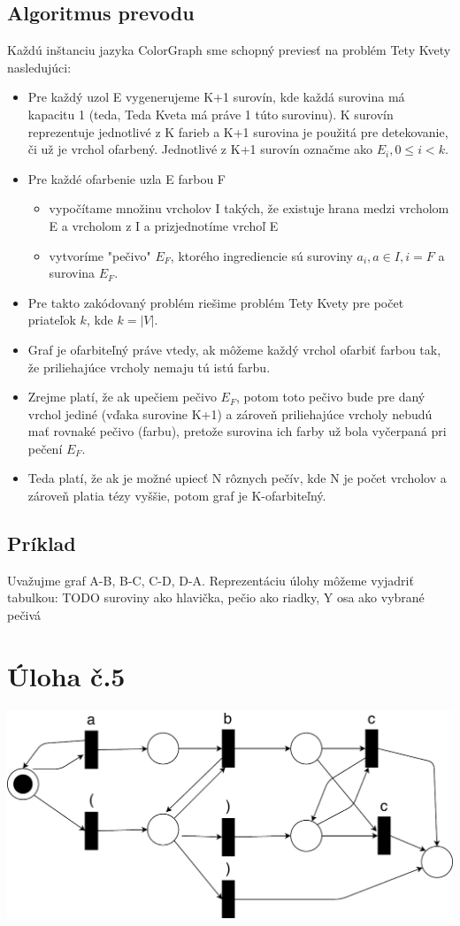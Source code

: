 \documentclass[10pt]{article}
\begin{document}
\subsection*{Algoritmus prevodu}
Každú inštanciu jazyka ColorGraph sme schopný previesť na problém Tety Kvety nasledujúci:
\begin{itemize}
    \item Pre každý uzol E vygenerujeme K+1 surovín, kde každá surovina má kapacitu 1 (teda, Teda
        Kveta má práve 1 túto surovinu). K surovín reprezentuje jednotlivé z K farieb a K+1 surovina
        je použitá pre detekovanie, či už je vrchol ofarbený.
        Jednotlivé z K+1 surovín označme ako $E_i, 0 \leq i < k$.
    \item Pre každé ofarbenie uzla E farbou F 
    \begin{itemize}
        \item vypočítame množinu vrcholov I takých, že existuje hrana medzi vrcholom E a vrcholom z
            I a prizjednotíme vrchoľ E
        \item vytvoríme "pečivo" $E_F$, ktorého ingrediencie sú suroviny $a_i, a \in I, i = F$ a
            surovina $E_F$.
    \end{itemize}
    \item Pre takto zakódovaný problém riešime problém Tety Kvety pre počet priateľok $k$, kde $k = |V|$.
    \item Graf je ofarbiteľný práve vtedy, ak môžeme každý vrchol ofarbiť farbou tak, že
        priliehajúce vrcholy nemaju tú istú farbu.
    \item Zrejme platí, že ak upečiem pečivo $E_F$, potom toto pečivo bude pre daný vrchol jediné
        (vďaka surovine K+1) a zároveň priliehajúce vrcholy nebudú mať rovnaké pečivo (farbu),
        pretože surovina ich farby už bola vyčerpaná pri pečení $E_F$.
    \item Teda platí, že ak je možné upiecť N rôznych pečív, kde N je počet vrcholov a zároveň
        platia tézy vyššie, potom graf je K-ofarbiteľný.
\end{itemize}
\subsection*{Príklad}
Uvažujme graf A-B, B-C, C-D, D-A. 
Reprezentáciu úlohy môžeme vyjadriť tabulkou:
TODO
suroviny ako hlavička, pečio ako riadky, Y osa ako vybrané pečivá
\section*{Úloha č.5}
\includegraphics{petriNetFinalTake.pdf}
\end{document}
